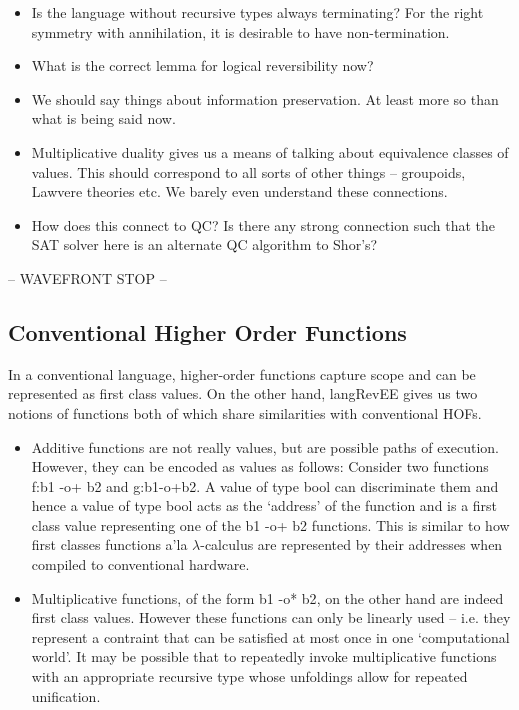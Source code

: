 \documentclass[preprint]{sigplanconf}
\newcommand{\lcal}{\ensuremath{\lambda}-calculus\xspace}
\begin{document}
\begin{itemize}

\item Is the language without recursive types always terminating? For
  the right symmetry with annihilation, it is desirable to have
  non-termination.

\item What is the correct lemma for logical reversibility now?

\item We should say things about information preservation. At least
  more so than what is being said now.


\item Multiplicative duality gives us a means of talking about
  equivalence classes of values. This should correspond to all sorts
  of other things -- groupoids, Lawvere theories etc. We barely even
  understand these connections.

\item How does this connect to QC? Is there any strong connection such
  that the SAT solver here is an alternate QC algorithm to Shor's?

\end{itemize}

-- WAVEFRONT STOP --

\subsection{Conventional Higher Order Functions}
\label{sec:hof}

In a conventional language, higher-order functions capture scope and
can be represented as first class values. On the other hand,
{{langRevEE}} gives us two notions of functions both of which share
similarities with conventional HOFs. 

\begin{itemize}
\item 
Additive functions are not really values, but are possible paths of
execution. However, they can be encoded as values as follows: Consider
two functions {{f:b1 -o+ b2}} and {{g:b1-o+b2}}. A value of type
{{bool}} can discriminate them and hence a value of type {{bool}} acts
as the `address' of the function and is a first class value
representing one of the {{b1 -o+ b2}} functions.  This is similar to
how first classes functions a'la \lcal are represented by their
addresses when compiled to conventional hardware.

\item
Multiplicative functions, of the form {{b1 -o* b2}}, on the other hand
are indeed first class values. However these functions can only be
linearly used -- i.e. they represent a contraint that can be satisfied
at most once in one `computational world'. It may be possible that to
repeatedly invoke multiplicative functions with an appropriate
recursive type whose unfoldings allow for repeated unification.
\end{itemize}
\end{document}

